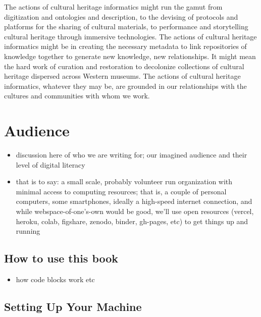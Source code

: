 \documentclass[
]{book}
\providecommand{\tightlist}{%
  \setlength{\itemsep}{0pt}\setlength{\parskip}{0pt}}
\begin{document}
The actions of cultural heritage informatics might run the gamut from digitization and ontologies and description, to the devising of protocols and platforms for the sharing of cultural materials, to performance and storytelling cultural heritage through immersive technologies. The actions of cultural heritage informatics might be in creating the necessary metadata to link repositories of knowledge together to generate new knowledge, new relationships. It might mean the hard work of curation and restoration to decolonize collections of cultural heritage dispersed across Western museums. The actions of cultural heritage informatics, whatever they may be, are grounded in our relationships with the cultures and communities with whom we work.

\hypertarget{intro}{%
\chapter{Audience}\label{intro}}

\begin{itemize}
\tightlist
\item
  discussion here of who we are writing for; our imagined audience and their level of digital literacy
\item
  that is to say: a small scale, probably volunteer run organization with minimal access to computing resources; that is, a couple of personal computers, some smartphones, ideally a high-speed internet connection, and while webspace-of-one's-own would be good, we'll use open resources (vercel, heroku, colab, figshare, zenodo, binder, gh-pages, etc) to get things up and running
\end{itemize}

\hypertarget{how-to-use}{%
\section{How to use this book}\label{how-to-use}}

\begin{itemize}
\tightlist
\item
  how code blocks work etc
\end{itemize}

\hypertarget{set-up}{%
\section{Setting Up Your Machine}\label{set-up}}
\end{document}
